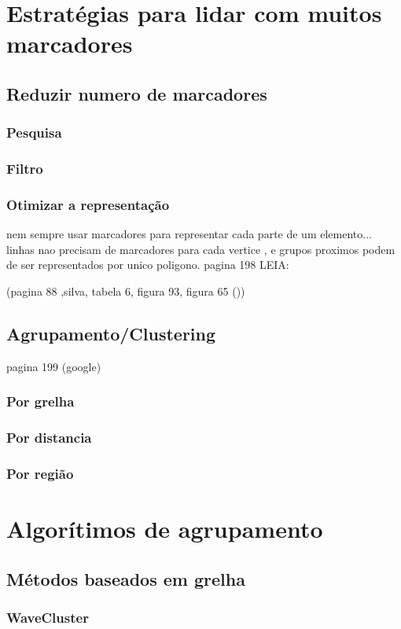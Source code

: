 \section{Estratégias para lidar com muitos marcadores}
  \subsection{Reduzir numero de marcadores}
	\subsubsection{Pesquisa}
	\subsubsection{Filtro}
	\subsubsection{Otimizar a representação}
nem sempre usar marcadores para representar cada parte de um elemento... linhas nao precisam de marcadores para cada vertice , e grupos proximos podem de ser representados por unico poligono.
 pagina 198
 LEIA:
 
 (pagina 88 ,silva, tabela 6, figura 93, figura 65 ())

  \subsection{Agrupamento/Clustering}
  pagina 199 (google)
		\subsubsection{Por grelha}
		\subsubsection{Por distancia}
		\subsubsection{Por região}
		
\section{Algorítimos de agrupamento}
	\subsection{Métodos baseados em grelha}
		\subsubsection{WaveCluster}
